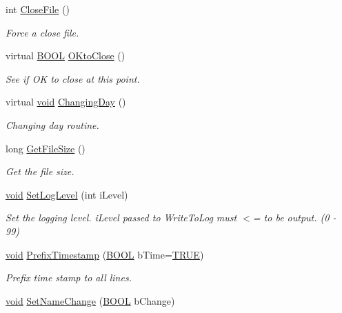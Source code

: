 \begin{DoxyCompactItemize}
int \hyperlink{class_c_logging_aa4bade3411ab028811a1450c6f6f84e6}{\-Close\-File} ()
\begin{DoxyCompactList}\small\item\em \-Force a close file. \end{DoxyCompactList}\item 
virtual \hyperlink{_cpclient_8h_a3be13892ae7076009afcf121347dd319}{\-B\-O\-O\-L} \hyperlink{class_c_logging_adca70c44549c19e61905b93a18fcc78f}{\-O\-Kto\-Close} ()
\begin{DoxyCompactList}\small\item\em \-See if \-O\-K to close at this point. \end{DoxyCompactList}\item 
virtual \hyperlink{_cpclient_8h_a6464f7480a0fd0ee170cba12b2c0497f}{void} \hyperlink{class_c_logging_a0b09b3ff686385532129d62407aa13f0}{\-Changing\-Day} ()
\begin{DoxyCompactList}\small\item\em \-Changing day routine. \end{DoxyCompactList}\item 
long \hyperlink{class_c_logging_a72d43e361e9eaa8f2b04b585560e64b4}{\-Get\-File\-Size} ()
\begin{DoxyCompactList}\small\item\em \-Get the file size. \end{DoxyCompactList}\item 
\hyperlink{_cpclient_8h_a6464f7480a0fd0ee170cba12b2c0497f}{void} \hyperlink{class_c_logging_a33138ea2dc91531b86939a6b35502bd9}{\-Set\-Log\-Level} (int i\-Level)
\begin{DoxyCompactList}\small\item\em \-Set the logging level. i\-Level passed to \-Write\-To\-Log must $<$= to be output. (0 -\/ 99) \end{DoxyCompactList}\item 
\hyperlink{_cpclient_8h_a6464f7480a0fd0ee170cba12b2c0497f}{void} \hyperlink{class_c_logging_af9de9b87995d383c8cb3f6194cab4a6d}{\-Prefix\-Timestamp} (\hyperlink{_cpclient_8h_a3be13892ae7076009afcf121347dd319}{\-B\-O\-O\-L} b\-Time=\hyperlink{_x_plat_8h_aa8cecfc5c5c054d2875c03e77b7be15d}{\-T\-R\-U\-E})
\begin{DoxyCompactList}\small\item\em \-Prefix time stamp to all lines. \end{DoxyCompactList}\item 
\hyperlink{_cpclient_8h_a6464f7480a0fd0ee170cba12b2c0497f}{void} \hyperlink{class_c_logging_a9fe42df859d38b72a76b594a0d54b5f0}{\-Set\-Name\-Change} (\hyperlink{_cpclient_8h_a3be13892ae7076009afcf121347dd319}{\-B\-O\-O\-L} b\-Change)

\end{DoxyCompactItemize}
